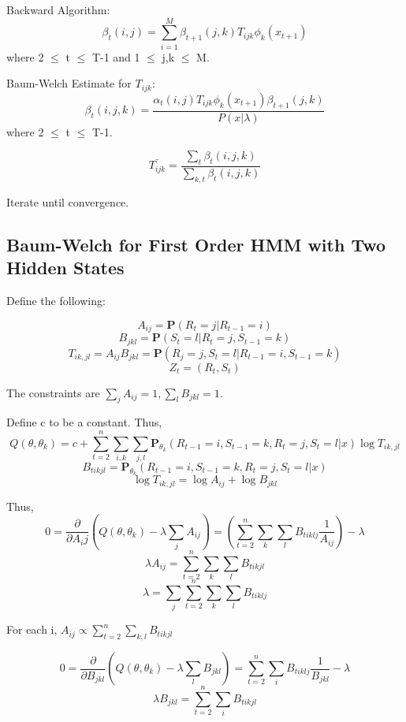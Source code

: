 \documentclass{article} %
\begin{document}
Backward Algorithm: \newline
$$\beta_t(i,j) = \sum_{i=1}^M \beta_{t+1}(j,k) T_{ijk} \phi_k(x_{t+1})$$
where 2 $\leq$ t $\leq$ T-1 and 1 $\leq$ j,k $\leq$ M. \newline

Baum-Welch Estimate for $T_{ijk}$: \newline
$$\beta_t(i,j,k) = \frac{\alpha_t(i,j) T_{ijk} \phi_k(x_{t+1}) \beta_{t+1}(j,k)}{P(x|\lambda)}$$ 
where 2 $\leq$ t $\leq$ T-1. \newline

$$\bar{T_{ijk}} = \frac{\sum_t \beta_t (i,j,k)}{\sum_{k,t} \beta_t (i,j,k)}$$

Iterate until convergence. 

\subsection{Baum-Welch for First Order HMM with Two Hidden States}
\label{3rdHMM}
Define the following:

$$A_{ij} = \textbf{P} (R_t = j | R_{t-1} = i)$$
$$B_{jkl} = \textbf{P} (S_t = l | R_t = j, S_{t-1} = k)$$ 
$$T_{ik, jl} = A_{ij} B_{jkl} = \textbf{P} (R_j = j, S_t = l | R_{t-1} = i, S_{t-1} = k)$$
$$Z_t = (R_t, S_t)$$

The constraints are $\sum_j A_{ij} = 1, \sum_l B_{jkl} = 1.$ \newline

Define c to be a constant. Thus,  \newline
$$Q(\theta, \theta_k) = c + \sum_{t=2}^n \sum_{i,k} \sum_{j,l} \textbf{P}_{\theta_k} (R_{t-1} = i, S_{t-1} = k, R_t = j, S_t = l | x) \log T_{ik, jl}$$ 
$$B_{tikjl} = \textbf{P}_{\theta_k} (R_{t-1} = i, S_{t-1} = k, R_t = j, S_t = l | x)$$
$$\log T_{ik, jl} = \log A_{ij} + \log B_{jkl}$$

Thus, \newline
$$ 0 = \frac{\partial}{\partial A_ij}(Q(\theta, \theta_k) - \lambda \sum_{j} A_{ij}) = (\sum_{t=2}^n \sum_k \sum_l B_{tiklj} \frac{1}{A_{ij}}) - \lambda$$
$$\lambda A_{ij} = \sum_{t=2}^n \sum_k \sum_l B_{tikjl}$$
$$\lambda = \sum_j \sum_{t=2}^n \sum_k \sum_l B_{tiklj}$$

For each i, $A_{ij} \propto \sum_{t=2}^n \sum_{k,l} B_{tikjl}$ \newline

$$ 0 = \frac{\partial}{\partial B_{jkl}} (Q(\theta, \theta_k) - \lambda \sum_l B_{jkl}) = \sum_{t=2}^n \sum_i B_{tiklj} \frac{1}{B_{jkl}} - \lambda$$
$$ \lambda B_{jkl} = \sum_{t=2}^n \sum_i B_{tikjl}$$
\end{document}
